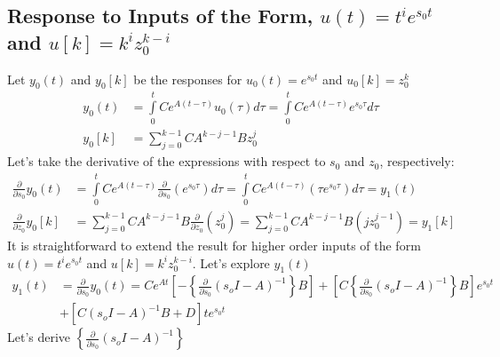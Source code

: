\documentclass[twoside]{article}
\begin{document}
\subsection{Response to Inputs of the Form, $u(t) = t^i e^{s_0 t}$ and
$u[k] = k^i z_0^{k-i}$}

Let $y_0(t)$ and $y_0[k]$ be the responses for $u_0(t) = e^{s_0 t}$ and
$u_0[k] = z_0^{k}$ 
%
\begin{align*} 
y_0(t) &= \int\limits_{0}^t C e^{A(t-\tau)} u_0(\tau) d \tau =
         \int\limits_{0}^t C e^{A(t-\tau)} e^{s_0 \tau} d \tau
\\[1ex]
y_0[k] &= \sum\limits_{j = 0}^{k-1} C A^{k-j-1} B z_0^{j}
\end{align*}
%
Let's take the derivative of the expressions with respect to $s_0$ and
$z_0$, respectively:
%  
%
\begin{align*} 
\frac{\partial}{\partial s_0}y_0(t) &= 
         \int\limits_{0}^t C e^{A(t-\tau)} \frac{\partial}{\partial s_0}
                                     \left( e^{s_0 \tau} \right)
                                      d \tau = \int\limits_{0}^t C e^{A(t-\tau)}
                                    \left( \tau e^{s_0 \tau} \right) d \tau = y_1(t)
\\[1ex]
\frac{\partial}{\partial z_0} y_0[k] &= \sum\limits_{j = 0}^{k-1} C
                                       A^{k-j-1} B \frac{\partial}{\partial z_0} \left( z_0^{j}
                                       \right) 
= \sum\limits_{j = 0}^{k-1} C
                                       A^{k-j-1} B \left( j z_0^{j-1} \right) = y_1[k]
\end{align*}
%
It is straightforward to extend the result for higher order inputs of
the form $u(t) = t^i e^{s_0 t}$ and $u[k] = k^i z_0^{k-i}$. Let's
explore $y_1(t)$ 
%
\begin{align*} 
y_1(t) &= \frac{\partial}{\partial s_0}y_0(t) = C e^{A t} \left[ -
                                             \left\lbrace
                                               \frac{\partial}{\partial
                                               s_0} (s_o I - A)^{-1} \right\rbrace B
\right] + \left[ C \left\lbrace \frac{\partial}{\partial s_0} (s_o I -
                                               A)^{-1} \right\rbrace B
                                               \right] e^{s_0 t}
\\ &+ \left[ C (s_o I - A)^{-1} B + D \right] t e^{s_0 t}
\end{align*}
%
Let's derive $\left\lbrace \frac{\partial}{\partial s_0} (s_o I -
  A)^{-1} \right\rbrace$
\end{document}
